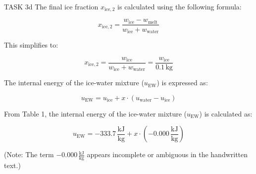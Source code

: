 TASK 3d  
The final ice fraction \( x_{\text{ice},2} \) is calculated using the following formula:  

\[
x_{\text{ice},2} = \frac{w_{\text{ice}} - w_{\text{melt}}}{w_{\text{ice}} + w_{\text{water}}}
\]

This simplifies to:  

\[
x_{\text{ice},2} = \frac{w_{\text{ice}}}{w_{\text{ice}} + w_{\text{water}}} = \frac{w_{\text{ice}}}{0.1 \, \text{kg}}
\]

The internal energy of the ice-water mixture (\( u_{\text{EW}} \)) is expressed as:  

\[
u_{\text{EW}} = u_{\text{ice}} + x \cdot (u_{\text{water}} - u_{\text{ice}})
\]

From Table 1, the internal energy of the ice-water mixture (\( u_{\text{EW}} \)) is calculated as:  

\[
u_{\text{EW}} = -333.7 \, \frac{\text{kJ}}{\text{kg}} + x \cdot (-0.000 \, \frac{\text{kJ}}{\text{kg}})
\]  

(Note: The term \( -0.000 \, \frac{\text{kJ}}{\text{kg}} \) appears incomplete or ambiguous in the handwritten text.)